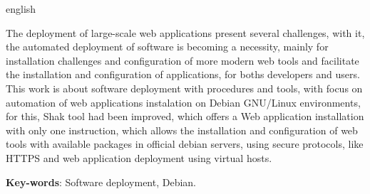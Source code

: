 \begin{resumo}[Abstract]
 \begin{otherlanguage*}{english}

   The deployment of large-scale web applications present several challenges, with
   it, the automated deployment of software is becoming a necessity, mainly for
   installation challenges and configuration of more modern web tools and
   facilitate the installation and configuration of applications, for boths
   developers and users. This work is about software deployment with procedures
   and tools, with focus on automation of web applications instalation on
   Debian GNU/Linux environments,
   for this, Shak tool had been improved, which offers a Web
   application installation with only one instruction, which allows the installation
   and configuration of web tools with available packages in official debian servers,
   using secure protocols, like HTTPS and web application deployment using virtual hosts.
   \vspace{\onelineskip}

   \noindent
   \textbf{Key-words}: Software deployment, Debian.
 \end{otherlanguage*}
\end{resumo}
